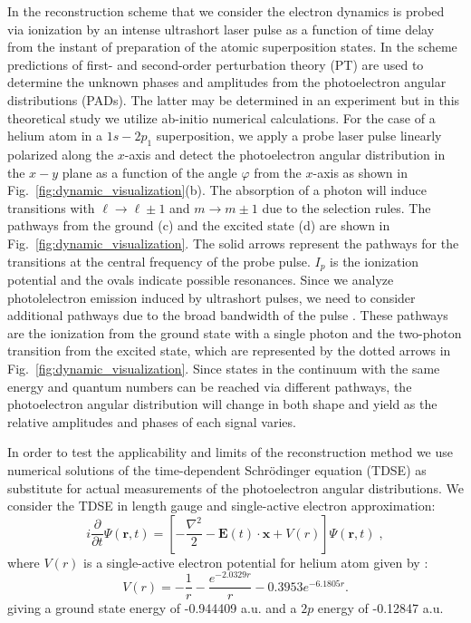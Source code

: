 In the reconstruction scheme that we consider the electron dynamics is probed via ionization by an intense ultrashort laser pulse as a function of time delay from the instant of preparation of the atomic superposition states. In the scheme predictions of first- and second-order perturbation theory (PT) are used to determine the unknown phases and amplitudes from the photoelectron angular distributions (PADs). The latter may be determined in an experiment but in this theoretical study we utilize ab-initio numerical calculations. For the case of a helium atom in a $1s-2p_1$ superposition, we apply a probe laser pulse linearly polarized along the $x$-axis and detect the photoelectron angular distribution in the $x-y$ plane as a function of the angle $\varphi$ from the $x$-axis as shown in Fig.~\ref{fig:dynamic_visualization}(b). The absorption of a photon will induce transitions with $\ell \rightarrow \ell \pm 1$ and $m \rightarrow m \pm 1$ due to the selection rules. The pathways from the ground (c) and the excited state (d) are shown in Fig.\ \ref{fig:dynamic_visualization}. The solid arrows represent the pathways for the transitions at the central frequency of the probe pulse. $I_p$ is the ionization potential and the ovals indicate possible resonances. Since we analyze photolelectron emission induced by ultrashort pulses, we need to consider additional pathways due to the broad bandwidth of the pulse \cite{venzke2020_ionization}. These pathways are the ionization from the ground state with a single photon and the two-photon transition from the excited state, which are represented by the dotted arrows in Fig.~\ref{fig:dynamic_visualization}. Since states in the continuum with the same energy and quantum numbers can be reached via different pathways, the photoelectron angular distribution will change in both shape and yield as the relative amplitudes and phases of each signal varies.


In order to test the applicability and limits of the reconstruction method we use numerical solutions of the time-dependent Schr\"odinger equation (TDSE) as substitute for actual measurements of the photoelectron angular distributions. We consider the TDSE in length gauge and single-active electron approximation:
%
\begin{equation}
i\frac{\partial}{\partial t}\Psi(\mathbf{r},t) = \left[-\frac{\nabla^2}{2} - \mathbf{E}(t) \cdot \mathbf{x} + V(r)\right]\Psi(\mathbf{r},t)\; ,
\end{equation}
%
where $V(r)$ is a single-active electron potential for helium atom given by \cite{reiff2020}:
%
\begin{equation}
V(r) = -\frac{1}{r} - \frac{e^{-2.0329r}}{r} - 0.3953 e^{-6.1805r}.
\end{equation}
%
giving a ground state energy of -0.944409 a.u. and a $2p$ energy of -0.12847 a.u.

